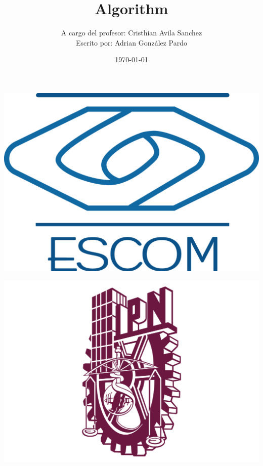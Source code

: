 \documentclass[10pt,executivepaper]{article}
\title{Algorithm}
\author{A cargo del profesor: Cristhian Avila Sanchez\\Escrito por: Adrian González Pardo}
\date{\today}
\begin{document}
\begin{minipage}{0.4\textwidth}
	\begin{flushleft}
		\includegraphics[scale = 0.05]{imgs/logoescom.png}
	\end{flushleft}
\end{minipage}
\begin{minipage}{0.51\textwidth}
	\begin{flushright}
		\includegraphics[scale = 0.055]{imgs/logoipn.png}
	\end{flushright}
\end{minipage}
\end{document}
